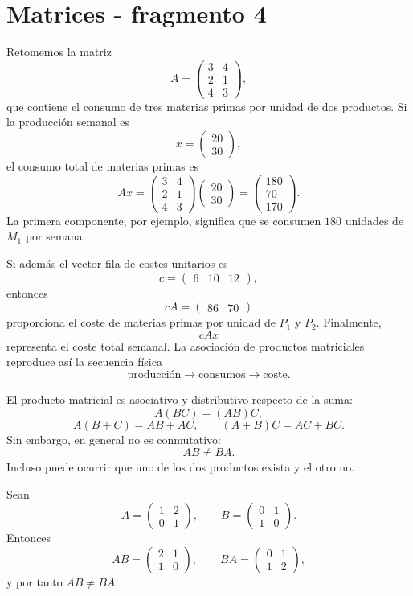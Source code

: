 \section{Matrices - fragmento 4}
\begin{example}
Retomemos la matriz
\[
A=
\begin{pmatrix}
3&4\\
2&1\\
4&3
\end{pmatrix},
\]
que contiene el consumo de tres materias primas por unidad de dos productos. Si la producción semanal es
\[
x=\begin{pmatrix}20\\30\end{pmatrix},
\]
el consumo total de materias primas es
\[
Ax=
\begin{pmatrix}
3&4\\
2&1\\
4&3
\end{pmatrix}
\begin{pmatrix}20\\30\end{pmatrix}
=
\begin{pmatrix}
180\\70\\170
\end{pmatrix}.
\]
La primera componente, por ejemplo, significa que se consumen $180$ unidades de $M_1$ por semana.

Si además el vector fila de costes unitarios es
\[
c=\begin{pmatrix}6&10&12\end{pmatrix},
\]
entonces
\[
cA
=
\begin{pmatrix}86&70\end{pmatrix}
\]
proporciona el coste de materias primas por unidad de $P_1$ y $P_2$. Finalmente,
\[
cAx
\]
representa el coste total semanal. La asociación de productos matriciales reproduce así la secuencia física
\[
\text{producción}\longrightarrow\text{consumos}\longrightarrow\text{coste}.
\]
\end{example}

El producto matricial es asociativo y distributivo respecto de la suma:
\[
A(BC)=(AB)C,
\]
\[
A(B+C)=AB+AC,
\qquad
(A+B)C=AC+BC.
\]
Sin embargo, en general no es conmutativo:
\[
AB\neq BA.
\]
Incluso puede ocurrir que uno de los dos productos exista y el otro no.

\begin{example}
Sean
\[
A=\begin{pmatrix}1&2\\0&1\end{pmatrix},
\qquad
B=\begin{pmatrix}0&1\\1&0\end{pmatrix}.
\]
Entonces
\[
AB=\begin{pmatrix}2&1\\1&0\end{pmatrix},
\qquad
BA=\begin{pmatrix}0&1\\1&2\end{pmatrix},
\]
y por tanto $AB\neq BA$.
\end{example}

